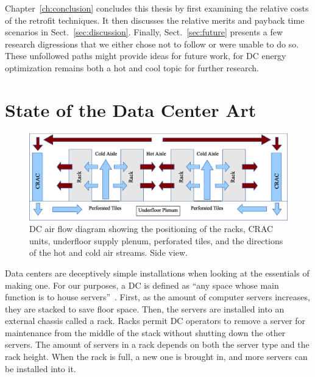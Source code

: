 \documentclass[officiallayout]{tktla}
\begin{document}
Chapter~\ref{ch:conclusion} concludes this thesis by first examining the
relative costs of the retrofit techniques. It then discusses the relative
merits and payback time scenarios in Sect.~\ref{sec:discussion}.
Finally, Sect.~\ref{sec:future} presents a few research digressions that we
either chose not to follow or were unable to do so.  These unfollowed paths
might provide ideas for future work, for DC energy optimization remains both a
hot and cool topic for further research.



\chapter{State of the Data Center Art}
\label{ch:state}

\begin{figure}
\centering
\includegraphics[width=\linewidth]{figs/DC_air_flow_tall}
\caption{DC air flow diagram showing the positioning of the racks, CRAC units,
underfloor supply plenum, perforated tiles, and the directions of the hot and
cold air streams. Side view.}
\label{fig:DC_air_flow}
\end{figure}

Data centers are deceptively simple installations when looking at the
essentials of making one. For our purposes, a DC is defined as ``any space
whose main function is to house servers''~\cite{Koomey2008}. First, as the
amount of computer servers increases, they are stacked to save floor space.
Then, the servers are installed into an external chassis called a rack. Racks
permit DC operators to remove a server for maintenance from the middle of the
stack without shutting down the other servers. The amount of servers in a rack
depends on both the server type and the rack height. When the rack is full, a
new one is brought in, and more servers can be installed into it.
\end{document}
